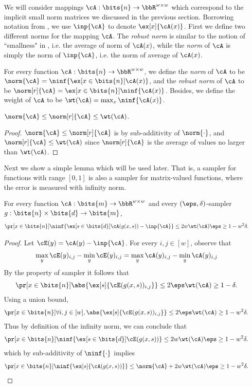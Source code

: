 We will consider mappings $\cA:\bits{n}\to\bbR^{w\times w}$ which correspond to the implicit small norm matrices we discussed in the previous section. Borrowing notation from , we use $\inp{\cA}$ to denote $\ex[x]{\cA(x)}$. First we define two different norms for the mapping $\cA$. The \emph{robust norm} is similar to the notion of ``smallness" in \cite{BCG18}, i.e. the average of norm of $\cA(x)$, while the \emph{norm} of $\cA$ is simply the norm of $\inp{\cA}$, i.e. the norm of average of $\cA(x)$. 
\begin{definition}
For every function $\cA:\bits{n}\to\bbR^{w\times w}$, we define the \emph{norm} of $\cA$ to be $\norm{\cA}=\ninf{\ex[x\in\bits{n}]{\cA(x)}}$, and the \emph{robust norm} of $\cA$ to be  $\norm[r]{\cA}=\ex[x\in\bits{n}]{\ninf{\cA(x)}}$. Besides, we define the weight of $\cA$ to be  $\wt(\cA)=\max_x \ninf{\cA(x)}$.
\end{definition}
\begin{claim}\label{claim:norms}
$\norm{\cA}\le\norm[r]{\cA}\le \wt(\cA)$.
\end{claim}
\begin{proof}
$\norm{\cA}\le\norm[r]{\cA}$ is by sub-additivity of $\norm{\cdot}$, and $\norm[r]{\cA}\le \wt(\cA)$ since $\norm[r]{\cA}$ is the average of values no larger than $\wt(\cA)$.
\end{proof}
\noindent
Next we show a simple lemma which will be used later. That is, a sampler for functions with range $[0,1]$ is also a sampler for matrix-valued functions, where the error is measured with infinity norm. 
\begin{lemma}\label{lemma:mat-samp-general}
For every function $\cA:\bits{m}\to\bbR^{w\times w}$ and every $(\eps,\delta)$-sampler $g:\bits{n}\times\bits{d}\to\bits{m}$,
$$\pr[x\in\bits{n}]{\ninf{\ex[s\in\bits{d}]{\cA(g(x,s))}-\inp{\cA}}\le 2w\wt(\cA)\eps}\ge 1- w^2\delta.$$
\end{lemma}
\begin{proof}
Let $\cE(y)=\cA(y)-\inp{\cA}$. For every $i,j\in[w]$, observe that 
$$\max_y \cE(y)_{i,j}-\min_y \cE(y)_{i,j}= \max_y \cA(y)_{i,j}-\min_y \cA(y)_{i,j}$$ 
By the property of sampler it follows that
$$\pr[x\in\bits{n}]{\abs{\ex[s]{\cE(g(x,s))_{i,j}}}\le 2\eps\wt(\cA)}\ge 1-\delta.$$ Using a union bound, 
$$\pr[x\in\bits{n}]{\forall i,j\in[w], \abs{\ex[s]{\cE(g(x,s))_{i,j}}}\le 2\eps\wt(\cA) }\ge 1- w^2\delta.$$
Thus by definition of the infinity norm, we can conclude that 
$$\pr[x\in\bits{n}]{\ninf{\ex[s\in\bits{d}]{\cE(g(x,s))}}\le 2w\wt(\cA)\eps }\ge 1-w^2\delta.$$
which by sub-additivity of $\ninf{\cdot}$ implies 
$$\pr[x\in\bits{n}]{\ninf{\ex[s]{\cA(g(x,s))}}\le \norm{\cA}+2w\wt(\cA)\eps}\ge 1- w^2\delta.$$
\end{proof}
